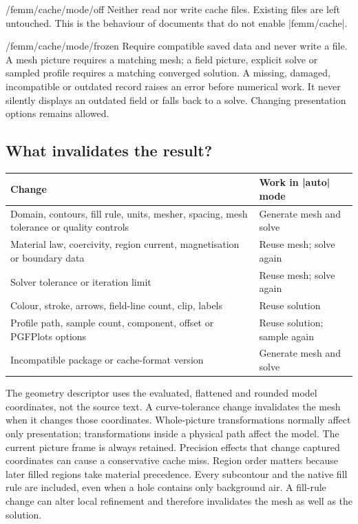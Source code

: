 \begin{key}{/femm/cache/mode/off}
Neither read nor write cache files. Existing files are left untouched.
This is the behaviour of documents that do not enable |femm/cache|.
\end{key}
\begin{key}{/femm/cache/mode/frozen}
Require compatible saved data and never write a file. A mesh picture
requires a matching mesh; a field picture, explicit solve or sampled
profile requires a matching converged solution. A missing, damaged,
incompatible or outdated record raises an error before numerical work.
It never silently displays an outdated field or falls back to a solve.
Changing presentation options remains allowed.
\end{key}

\subsection{What invalidates the result?}
\begin{center}
\begin{tabular}{p{.57\linewidth}p{.34\linewidth}}
\toprule Change & Work in |auto| mode \\
\midrule
Domain, contours, fill rule, units, mesher, spacing, mesh tolerance or quality controls
  & Generate mesh and solve \\
Material law, coercivity, region current, magnetisation or boundary data
  & Reuse mesh; solve again \\
Solver tolerance or iteration limit & Reuse mesh; solve again \\
Colour, stroke, arrows, field-line count, clip, labels
  & Reuse solution \\
Profile path, sample count, component, offset or PGFPlots options
  & Reuse solution; sample again \\
Incompatible package or cache-format version & Generate mesh and solve \\
\bottomrule
\end{tabular}
\end{center}

The geometry descriptor uses the evaluated, flattened and rounded model
coordinates, not the source text. A curve-tolerance change invalidates the
mesh when it changes those coordinates. Whole-picture transformations
normally affect only presentation; transformations inside a physical path
affect the model. The current picture frame is always retained. Precision
effects that change captured coordinates can cause a conservative cache miss.
Region order matters because later filled regions take material precedence.
Every subcontour and the native fill rule are included, even when a hole
contains only background air. A fill-rule change can alter local refinement
and therefore invalidates the mesh as well as the solution.

